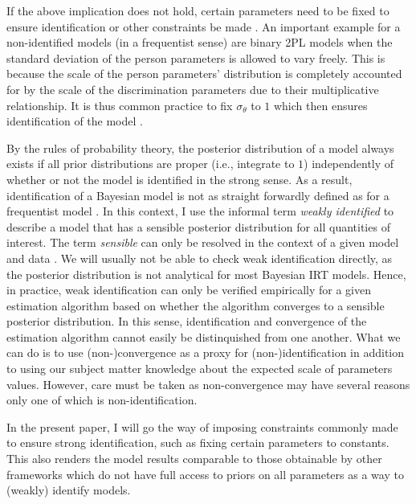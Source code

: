 \documentclass[
]{jss}
\begin{document}
If the above implication does not hold, certain parameters need to be
fixed to ensure identification or other constraints be made
\citep[e.g.,][]{sanmartin2015, sanmartin2010, bollen2009}. An important
example for a non-identified models (in a frequentist sense) are binary
2PL models when the standard deviation of the person parameters is
allowed to vary freely. This is because the scale of the person
parameters' distribution is completely accounted for by the scale of the
discrimination parameters due to their multiplicative relationship. It
is thus common practice to fix \(\sigma_\theta\) to \(1\) which then
ensures identification of the model \citep[e.g.,][]{vanderlinden1997}.

By the rules of probability theory, the posterior distribution of a
model always exists if all prior distributions are proper (i.e.,
integrate to \(1\)) independently of whether or not the model is
identified in the strong sense. As a result, identification of a
Bayesian model is not as straight forwardly defined as for a frequentist
model \citetext{\citealp[see][ for a thorough discussion on notions of
Bayesian identifiability]{sanmartin2010}; \citealp[see
also][]{fox2010}; \citealp[and][ for discussions in the context of IRT
models]{levy2017}}. In this context, I use the informal term
\emph{weakly identified} to describe a model that has a sensible
posterior distribution for all quantities of interest. The term
\emph{sensible} can only be resolved in the context of a given model and
data \citep[see also][]{gelman2017}. We will usually not be able to
check weak identification directly, as the posterior distribution is not
analytical for most Bayesian IRT models. Hence, in practice, weak
identification can only be verified empirically for a given estimation
algorithm based on whether the algorithm converges to a sensible
posterior distribution. In this sense, identification and convergence of
the estimation algorithm cannot easily be distinquished from one
another. What we can do is to use (non-)convergence as a proxy for
(non-)identification in addition to using our subject matter knowledge
about the expected scale of parameters values. However, care must be
taken as non-convergence may have several reasons only one of which is
non-identification.

In the present paper, I will go the way of imposing constraints commonly
made to ensure strong identification, such as fixing certain parameters
to constants. This also renders the model results comparable to those
obtainable by other frameworks which do not have full access to priors
on all parameters as a way to (weakly) identify models.
\end{document}
